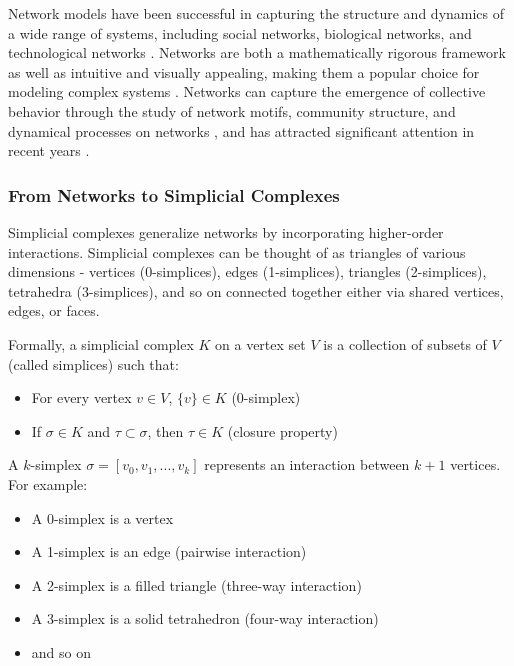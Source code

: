 Network models have been successful in capturing the structure and dynamics of a wide range of systems, including social networks, biological networks, and technological networks \citep{newman2003structure, albert2002statistical, strogatz2001exploring}. Networks are both a mathematically rigorous framework as well as intuitive and visually appealing, making them a popular choice for modeling complex systems \citep{newman2010networks}. Networks can capture the emergence of collective behavior through the study of network motifs, community structure, and dynamical processes on networks \citep{milo2002network, fortunato2010community, barrat2008dynamical}, and has attracted significant attention in recent years \citep{barabasi2016network}.

\subsubsection{From Networks to Simplicial Complexes}

Simplicial complexes generalize networks by incorporating higher-order interactions. Simplicial complexes can be thought of as triangles of various dimensions - vertices (0-simplices), edges (1-simplices), triangles (2-simplices), tetrahedra (3-simplices), and so on \citep{petri2014homological} connected together either via shared vertices, edges, or faces.

Formally, a simplicial complex $K$ on a vertex set $V$ is a collection of subsets of $V$ (called simplices) such that:
\begin{itemize}
    \item For every vertex $v \in V$, $\{v\} \in K$ (0-simplex)
    \item If $\sigma \in K$ and $\tau \subset \sigma$, then $\tau \in K$ (closure property)
\end{itemize}

A $k$-simplex $\sigma = [v_0, v_1, ..., v_k]$ represents an interaction between $k+1$ vertices. For example:
\begin{itemize}
    \item A 0-simplex is a vertex
    \item A 1-simplex is an edge (pairwise interaction)
    \item A 2-simplex is a filled triangle (three-way interaction)
    \item A 3-simplex is a solid tetrahedron (four-way interaction)
    \item and so on
\end{itemize}

